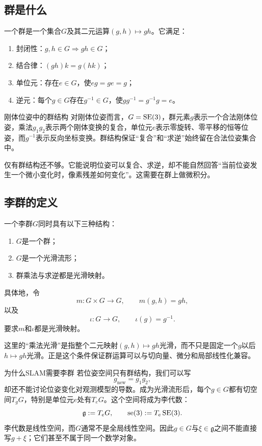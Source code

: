 \subsection{群是什么}

\begin{definition}[群]
一个群是一个集合$G$及其二元运算$(g,h)\mapsto gh$。它满足：
\begin{enumerate}
    \item 封闭性：$g,h\in G\Longrightarrow gh\in G$；
    \item 结合律：$(gh)k=g(hk)$；
    \item 单位元：存在$e\in G$，使$eg=ge=g$；
    \item 逆元：每个$g\in G$存在$g^{-1}\in G$，使$gg^{-1}=g^{-1}g=e$。
\end{enumerate}
\end{definition}

\begin{lieexample}{刚体位姿中的群结构}
对刚体位姿而言，$G=\operatorname{SE}(3)$，群元素$g$表示一个合法刚体位姿，乘法$g_1g_2$表示两个刚体变换的复合，单位元$e$表示零旋转、零平移的恒等位姿，而$g^{-1}$表示反向坐标变换。群结构保证“复合”和“求逆”始终留在合法位姿集合中。
\end{lieexample}

仅有群结构还不够。它能说明位姿可以复合、求逆，却不能自然回答“当前位姿发生一个微小变化时，像素残差如何变化”。这需要在群上做微积分。

\subsection{李群的定义}

\begin{definition}[李群]
一个李群$G$同时具有以下三种结构：
\begin{enumerate}
    \item $G$是一个群；
    \item $G$是一个光滑流形；
    \item 群乘法与求逆都是光滑映射。
\end{enumerate}
具体地，令
\[
    m:G\times G\to G,\qquad m(g,h)=gh,
\]
以及
\[
    \iota:G\to G,\qquad \iota(g)=g^{-1}.
\]
要求$m$和$\iota$都是光滑映射。
\end{definition}

这里的“乘法光滑”是指整个二元映射$(g,h)\mapsto gh$光滑，而不只是固定一个$g$以后$h\mapsto gh$光滑。正是这个条件保证群运算可以与切向量、微分和局部线性化兼容。

\begin{lieexample}{为什么SLAM需要李群}
若位姿空间只有群结构，我们可以写
\[
    g_{\mathrm{new}}=g_1g_2,
\]
却还不能讨论位姿变化对观测模型的导数。成为光滑流形后，每个$g\in G$都有切空间$T_gG$，特别是单位元$e$处有$T_eG$。这个空间将成为李代数：
\[
    \mathfrak g:=T_eG,
    \qquad
    \operatorname{se}(3):=T_e\operatorname{SE}(3).
\]
李代数是线性空间，而$G$通常不是全局线性空间。因此$g\in G$与$\xi\in\mathfrak g$之间不能直接写$g+\xi$；它们甚至不属于同一个数学对象。
\end{lieexample}

